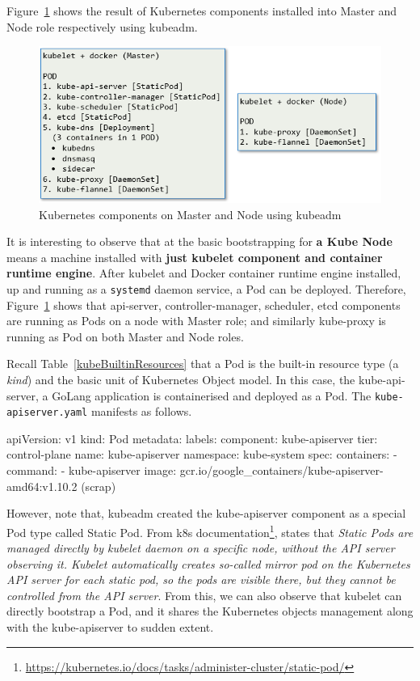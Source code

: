 \noindent Figure~\ref{fig:kubeadm} shows the result of Kubernetes components installed into Master and Node role respectively using kubeadm. 

\begin{figure}[H]
\centering
\includegraphics[width=0.55\paperwidth]{Figures/KUBE_kubeadm}
\decoRule
\caption[Kubernetes components on Master and Node using kubeadm]{Kubernetes components on Master and Node using kubeadm}
\label{fig:kubeadm}
\end{figure}

\noindent It is interesting to observe that at the basic bootstrapping for \textbf{a Kube Node} means a machine installed with \textbf{just kubelet component and container runtime engine}. After kubelet and Docker container runtime engine installed, up and running as a \verb|systemd| daemon service, a Pod can be deployed. Therefore, Figure~\ref{fig:kubeadm} shows that api-server, controller-manager, scheduler, etcd components are running as Pods on a node with Master role; and similarly kube-proxy is running as Pod on both Master and Node roles.

Recall Table~\ref{kubeBuiltinResources} that a Pod is the built-in resource type (a \emph{kind}) and the basic unit of Kubernetes Object model. In this case, the kube-api-server, a GoLang application is containerised and deployed as a Pod. The \verb|kube-apiserver.yaml| manifests as follows.

\begin{lcverbatim}
apiVersion: v1
kind: Pod
metadata:
  labels:
    component: kube-apiserver
    tier: control-plane
  name: kube-apiserver
  namespace: kube-system
spec:
  containers:
  - command:
    - kube-apiserver
    image: gcr.io/google_containers/kube-apiserver-amd64:v1.10.2
    (scrap)
\end{lcverbatim}

However, note that, kubeadm created the kube-apiserver component as a special Pod type called Static Pod. From k8s documentation\footnote{\url{https://kubernetes.io/docs/tasks/administer-cluster/static-pod/}}, \parencite{kubeDoc} states that \emph{Static Pods are managed directly by kubelet daemon on a specific node, without the API server observing it. Kubelet automatically creates so-called mirror pod on the Kubernetes API server for each static pod, so the pods are visible there, but they cannot be controlled from the API server}. From this, we can also observe that kubelet can directly bootstrap a Pod, and it shares the Kubernetes objects management along with the kube-apiserver to sudden extent.

